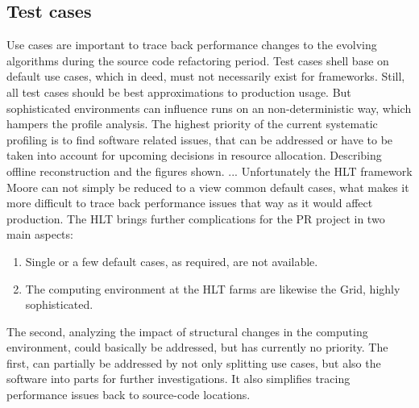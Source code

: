 \documentclass[a4paper]{jpconf}
\begin{document}
\subsection{Test cases}
\label{sec:test_cases}

Use cases are important to trace back performance changes to the evolving algorithms during the source code refactoring period. Test cases shell base on default use cases, which in deed, must not necessarily exist for frameworks. Still, all test cases should be best approximations to production usage. But sophisticated environments can influence runs on an non-deterministic way, which hampers the profile analysis. The highest priority of the current systematic profiling is to find software related issues, that can be addressed or have to be taken into account for upcoming decisions in resource allocation.
\newline
Describing offline reconstruction and the figures shown. ...
\newline
Unfortunately the HLT framework Moore can not simply be reduced to a view common default cases, what makes it more difficult to trace back performance issues that way as it would affect production. The HLT brings further complications for the PR project in two main aspects:
\begin{enumerate}
 \item Single or a few default cases, as required, are not available.
 \item The computing environment at the HLT farms are likewise the Grid, highly sophisticated.
\end{enumerate}
The second, analyzing the impact of structural changes in the computing environment, could basically be addressed, but has currently no priority. The first, can partially be addressed by not only splitting use cases, but also the software into parts for further investigations. It also simplifies tracing performance issues back to source-code locations. 
\end{document}
